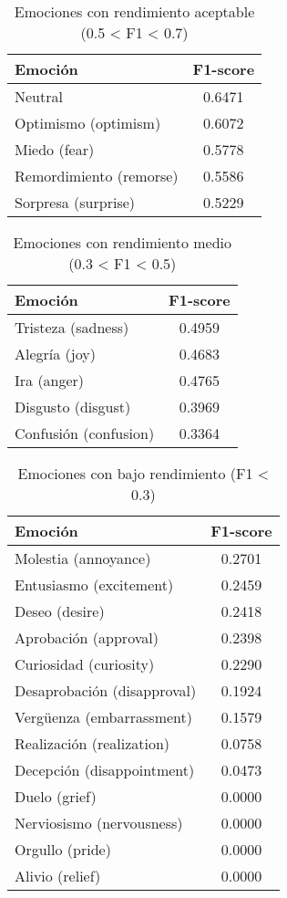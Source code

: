 \documentclass[12pt,a4paper]{report}
\begin{document}
\begin{table}[htbp]
  \centering
  \caption{Emociones con rendimiento aceptable (0.5 < F1 < 0.7)}
  \begin{tabular}{lc}
    \toprule
    \textbf{Emoción} & \textbf{F1-score} \\
    \midrule
    Neutral & 0.6471 \\
    Optimismo (optimism) & 0.6072 \\
    Miedo (fear) & 0.5778 \\
    Remordimiento (remorse) & 0.5586 \\
    Sorpresa (surprise) & 0.5229 \\
    \bottomrule
  \end{tabular}
\end{table}

\begin{table}[htbp]
  \centering
  \caption{Emociones con rendimiento medio (0.3 < F1 < 0.5)}
  \begin{tabular}{lc}
    \toprule
    \textbf{Emoción} & \textbf{F1-score} \\
    \midrule
    Tristeza (sadness) & 0.4959 \\
    Alegría (joy) & 0.4683 \\
    Ira (anger) & 0.4765 \\
    Disgusto (disgust) & 0.3969 \\
    Confusión (confusion) & 0.3364 \\
    \bottomrule
  \end{tabular}
\end{table}

\begin{table}[htbp]
  \centering
  \caption{Emociones con bajo rendimiento (F1 < 0.3)}
  \begin{tabular}{lc}
    \toprule
    \textbf{Emoción} & \textbf{F1-score} \\
    \midrule
    Molestia (annoyance) & 0.2701 \\
    Entusiasmo (excitement) & 0.2459 \\
    Deseo (desire) & 0.2418 \\
    Aprobación (approval) & 0.2398 \\
    Curiosidad (curiosity) & 0.2290 \\
    Desaprobación (disapproval) & 0.1924 \\
    Vergüenza (embarrassment) & 0.1579 \\
    Realización (realization) & 0.0758 \\
    Decepción (disappointment) & 0.0473 \\
    Duelo (grief) & 0.0000 \\
    Nerviosismo (nervousness) & 0.0000 \\
    Orgullo (pride) & 0.0000 \\
    Alivio (relief) & 0.0000 \\
    \bottomrule
  \end{tabular}
\end{table}
\end{document}

